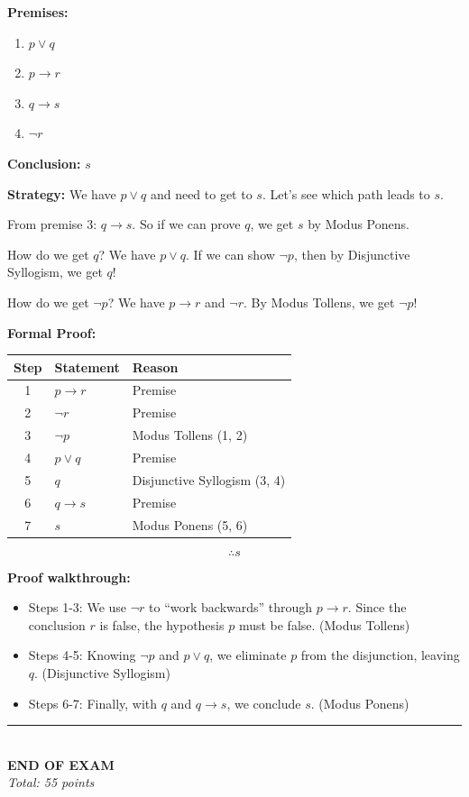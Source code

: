 \documentclass[11pt,a4paper]{article}
\begin{document}
\textbf{Premises:}
\begin{enumerate}[noitemsep]
    \item $p \lor q$
    \item $p \to r$
    \item $q \to s$
    \item $\neg r$
\end{enumerate}

\textbf{Conclusion:} $s$

\begin{solnbox}
\textbf{Strategy:} We have $p \lor q$ and need to get to $s$. Let's see which path leads to $s$.

From premise 3: $q \to s$. So if we can prove $q$, we get $s$ by Modus Ponens.

How do we get $q$? We have $p \lor q$. If we can show $\neg p$, then by Disjunctive Syllogism, we get $q$!

How do we get $\neg p$? We have $p \to r$ and $\neg r$. By Modus Tollens, we get $\neg p$!

\textbf{Formal Proof:}

\begin{center}
\begin{tabular}{c|l|l}
\toprule
\textbf{Step} & \textbf{Statement} & \textbf{Reason} \\
\midrule
1 & $p \to r$ & Premise \\
2 & $\neg r$ & Premise \\
3 & $\neg p$ & Modus Tollens (1, 2) \\
4 & $p \lor q$ & Premise \\
5 & $q$ & Disjunctive Syllogism (3, 4) \\
6 & $q \to s$ & Premise \\
7 & $s$ & Modus Ponens (5, 6) \\
\bottomrule
\end{tabular}
\end{center}

$$\boxed{\therefore s}$$

\textbf{Proof walkthrough:}
\begin{itemize}[noitemsep]
    \item Steps 1-3: We use $\neg r$ to ``work backwards'' through $p \to r$. Since the conclusion $r$ is false, the hypothesis $p$ must be false. (Modus Tollens)
    \item Steps 4-5: Knowing $\neg p$ and $p \lor q$, we eliminate $p$ from the disjunction, leaving $q$. (Disjunctive Syllogism)
    \item Steps 6-7: Finally, with $q$ and $q \to s$, we conclude $s$. (Modus Ponens)
\end{itemize}
\end{solnbox}

\vspace{20pt}

\begin{center}
\rule{0.5\textwidth}{0.5pt}\\[5pt]
\textbf{END OF EXAM}\\[3pt]
\textit{Total: 55 points}
\end{center}
\end{document}
